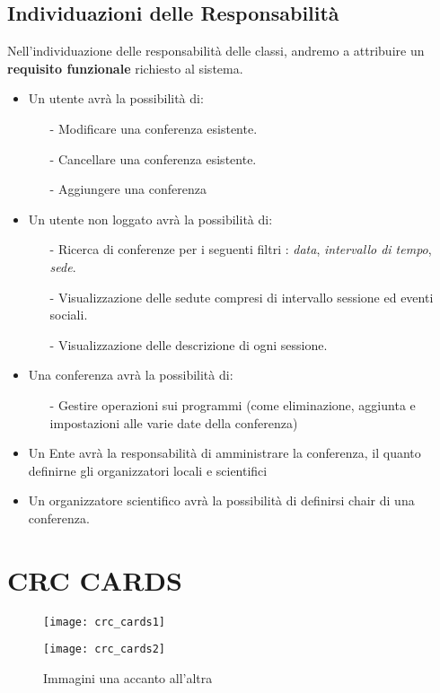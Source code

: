 \documentclass[a4paper,italian,10pt,openany]{book}
\begin{document}
	\section{Individuazioni delle Responsabilità}
	Nell'individuazione delle responsabilità delle classi, andremo a attribuire un \textbf{requisito funzionale} richiesto al sistema.
\begin{itemize}
\item Un utente avrà la possibilità di:
	\begin{itemize}
	\item[-] Modificare una conferenza esistente.
	\item[-] Cancellare una conferenza esistente.
	\item[-] Aggiungere una conferenza
	\end{itemize}
\item Un utente non loggato avrà la possibilità di:
	\begin{itemize}
	\item[-] Ricerca di conferenze per i seguenti filtri : \textit{data},  \textit{intervallo di tempo}, \textit{sede}.
	\item[-] Visualizzazione delle sedute compresi di intervallo sessione ed eventi sociali.
	\item[-] Visualizzazione delle descrizione di ogni sessione.
	\end{itemize}
	\item Una conferenza avrà la possibilità di:
	\begin{itemize}
	\item[-]Gestire operazioni sui programmi (come eliminazione, aggiunta e impostazioni alle varie date della conferenza)
	\end{itemize}
	\item Un Ente avrà la responsabilità di amministrare la conferenza, il quanto definirne gli organizzatori locali e scientifici
	\item Un organizzatore scientifico avrà la possibilità di definirsi chair di una conferenza.
\end{itemize}
\let\cleardoublepage\clearpage
	\chapter{CRC CARDS}
	\begin{figure}[htbp]
\begin{minipage}{0.4\textwidth}
\centering
\texttt{[image: crc\_cards1]}
\end{minipage}\hfill
\begin{minipage}{0.4\textwidth}
\centering
\texttt{[image: crc\_cards2]}
\end{minipage}
\caption{Immagini una accanto all'altra}
\end{figure}
\end{document}
